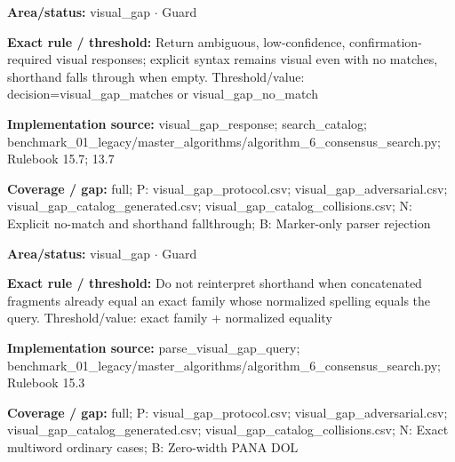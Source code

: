 \begin{tcolorbox}[enhanced,breakable,colback=white,colframe=Muted!45,boxrule=0.45pt,arc=1.5pt,left=6pt,right=6pt,top=5pt,bottom=5pt,title={\texttt{VG-RESPONSE-14}},title after break={\texttt{VG-RESPONSE-14}\ (continued)},fonttitle=\headingfont\bfseries\color{Navy},coltitle=Navy]
\textbf{Area/status:} visual\_\allowbreak{}gap $\boldsymbol{\cdot}$ Guard\par
\smallskip
\textbf{Exact rule / threshold:} Return ambiguous, low-confidence, confirmation-required visual responses; explicit syntax remains visual even with no matches, shorthand falls through when empty. Threshold/\allowbreak{}value: decision=visual\_\allowbreak{}gap\_\allowbreak{}matches or visual\_\allowbreak{}gap\_\allowbreak{}no\_\allowbreak{}match\par
\smallskip
\textbf{Implementation source:} visual\_\allowbreak{}gap\_\allowbreak{}response; search\_\allowbreak{}catalog; benchmark\_\allowbreak{}01\_\allowbreak{}legacy/\allowbreak{}master\_\allowbreak{}algorithms/\allowbreak{}algorithm\_\allowbreak{}6\_\allowbreak{}consensus\_\allowbreak{}search.py; Rulebook 15.7; 13.7\par
\smallskip
\textbf{Coverage / gap:} full; P: visual\_\allowbreak{}gap\_\allowbreak{}protocol.csv; visual\_\allowbreak{}gap\_\allowbreak{}adversarial.csv; visual\_\allowbreak{}gap\_\allowbreak{}catalog\_\allowbreak{}generated.csv; visual\_\allowbreak{}gap\_\allowbreak{}catalog\_\allowbreak{}collisions.csv; N: Explicit no-match and shorthand fallthrough; B: Marker-only parser rejection
\end{tcolorbox}
\begin{tcolorbox}[enhanced,breakable,colback=white,colframe=Muted!45,boxrule=0.45pt,arc=1.5pt,left=6pt,right=6pt,top=5pt,bottom=5pt,title={\texttt{VG-SHORTHAND-EXACT-GUARD-05}},title after break={\texttt{VG-SHORTHAND-EXACT-GUARD-05}\ (continued)},fonttitle=\headingfont\bfseries\color{Navy},coltitle=Navy]
\textbf{Area/status:} visual\_\allowbreak{}gap $\boldsymbol{\cdot}$ Guard\par
\smallskip
\textbf{Exact rule / threshold:} Do not reinterpret shorthand when concatenated fragments already equal an exact family whose normalized spelling equals the query. Threshold/\allowbreak{}value: exact family + normalized equality\par
\smallskip
\textbf{Implementation source:} parse\_\allowbreak{}visual\_\allowbreak{}gap\_\allowbreak{}query; benchmark\_\allowbreak{}01\_\allowbreak{}legacy/\allowbreak{}master\_\allowbreak{}algorithms/\allowbreak{}algorithm\_\allowbreak{}6\_\allowbreak{}consensus\_\allowbreak{}search.py; Rulebook 15.3\par
\smallskip
\textbf{Coverage / gap:} full; P: visual\_\allowbreak{}gap\_\allowbreak{}protocol.csv; visual\_\allowbreak{}gap\_\allowbreak{}adversarial.csv; visual\_\allowbreak{}gap\_\allowbreak{}catalog\_\allowbreak{}generated.csv; visual\_\allowbreak{}gap\_\allowbreak{}catalog\_\allowbreak{}collisions.csv; N: Exact multiword ordinary cases; B: Zero-width PANA DOL
\end{tcolorbox}
